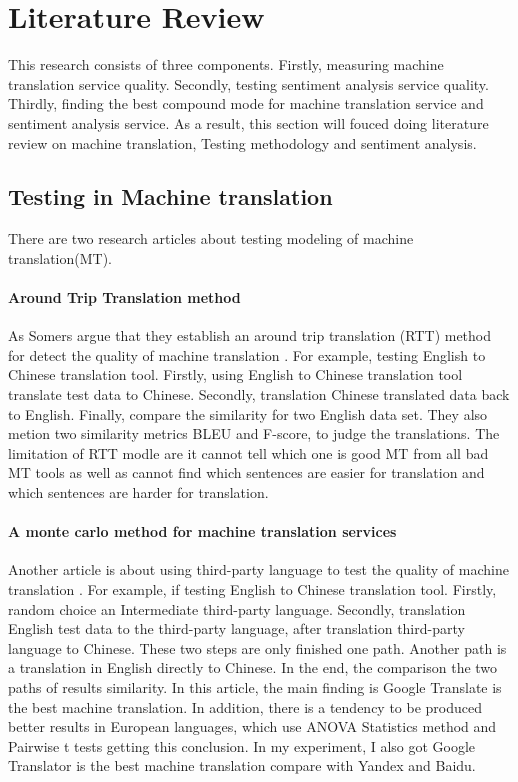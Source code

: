 \documentclass[conference]{IEEEtran}
\begin{document}
\section{Literature Review}
This research consists of three components.
Firstly, measuring machine translation service quality.
Secondly, testing sentiment analysis service quality.
Thirdly, finding the best compound mode for machine translation service and
sentiment analysis service.
As a result, this section will fouced doing literature review on machine
translation, Testing methodology and sentiment analysis.
\subsection{Testing in Machine translation}
There are two research articles about testing modeling of machine
translation(MT).

\paragraph{Around Trip Translation method}
As Somers argue that they establish an
around trip translation (RTT) method for detect the quality of machine translation \cite{roundTripTranslation}.
For example, testing English to Chinese translation tool.
Firstly, using English to Chinese translation tool translate test data to
Chinese.
Secondly, translation Chinese translated data back to English.
Finally, compare the similarity for two English data set.
They also metion two similarity metrics BLEU and F-score, to judge the
translations. The limitation of RTT modle are it cannot tell which one is good
MT from all bad MT tools as well as cannot find which sentences are easier for
translation and which sentences are harder for translation.

\paragraph{A monte carlo method for machine translation services}
Another article is about using third-party language to test the quality of machine
translation \cite{thirdPartMachineTranslation}.
For example, if testing English to Chinese translation tool.
Firstly, random choice an Intermediate third-party language.
Secondly, translation English test data to the third-party language, after
translation third-party language to Chinese.
These two steps are only finished one path.
Another path is a translation in English directly to Chinese.
In the end, the comparison the two paths of results similarity. In this article, the main
finding is Google Translate is the best machine translation. In addition, there
is a tendency to be produced better results in European languages, which use
ANOVA Statistics method and Pairwise t tests getting this conclusion.
In my experiment, I also got Google Translator is the best machine translation compare with Yandex and Baidu.
\end{document}

